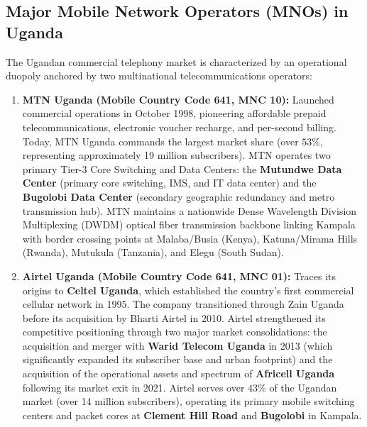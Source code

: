 \documentclass[12pt,a4paper]{report}
\begin{document}
\subsection{Major Mobile Network Operators (MNOs) in Uganda}
The Ugandan commercial telephony market is characterized by an operational duopoly anchored by two multinational telecommunications operators:
\begin{enumerate}
    \item \textbf{MTN Uganda (Mobile Country Code 641, MNC 10):}
    Launched commercial operations in October 1998, pioneering affordable prepaid telecommunications, electronic voucher recharge, and per-second billing. Today, MTN Uganda commands the largest market share (over $53\%$, representing approximately 19 million subscribers). MTN operates two primary Tier-3 Core Switching and Data Centers: the \textbf{Mutundwe Data Center} (primary core switching, IMS, and IT data center) and the \textbf{Bugolobi Data Center} (secondary geographic redundancy and metro transmission hub). MTN maintains a nationwide Dense Wavelength Division Multiplexing (DWDM) optical fiber transmission backbone linking Kampala with border crossing points at Malaba/Busia (Kenya), Katuna/Mirama Hills (Rwanda), Mutukula (Tanzania), and Elegu (South Sudan).
    
    \item \textbf{Airtel Uganda (Mobile Country Code 641, MNC 01):}
    Traces its origins to \textbf{Celtel Uganda}, which established the country's first commercial cellular network in 1995. The company transitioned through Zain Uganda before its acquisition by Bharti Airtel in 2010. Airtel strengthened its competitive positioning through two major market consolidations: the acquisition and merger with \textbf{Warid Telecom Uganda} in 2013 (which significantly expanded its subscriber base and urban footprint) and the acquisition of the operational assets and spectrum of \textbf{Africell Uganda} following its market exit in 2021. Airtel serves over $43\%$ of the Ugandan market (over 14 million subscribers), operating its primary mobile switching centers and packet cores at \textbf{Clement Hill Road} and \textbf{Bugolobi} in Kampala.
    

\end{enumerate}
\end{document}
